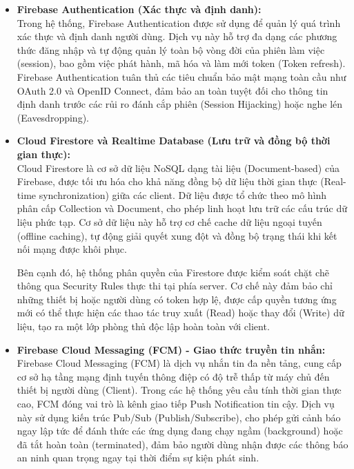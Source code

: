 \begin{itemize}
    \item \textbf{Firebase Authentication (Xác thực và định danh):}\\
    Trong hệ thống, Firebase Authentication được sử dụng để quản lý quá trình xác thực và định danh người dùng. Dịch vụ này hỗ trợ đa dạng các phương thức đăng nhập và tự động quản lý toàn bộ vòng đời của phiên làm việc (session), bao gồm việc phát hành, mã hóa và làm mới token (Token refresh). Firebase Authentication tuân thủ các tiêu chuẩn bảo mật mạng toàn cầu như OAuth 2.0 và OpenID Connect, đảm bảo an toàn tuyệt đối cho thông tin định danh trước các rủi ro đánh cắp phiên (Session Hijacking) hoặc nghe lén (Eavesdropping).

    \item \textbf{Cloud Firestore và Realtime Database (Lưu trữ và đồng bộ thời gian thực):}\\
    Cloud Firestore là cơ sở dữ liệu NoSQL dạng tài liệu (Document-based) của Firebase, được tối ưu hóa cho khả năng đồng bộ dữ liệu thời gian thực (Real-time synchronization) giữa các client. Dữ liệu được tổ chức theo mô hình phân cấp Collection và Document, cho phép linh hoạt lưu trữ các cấu trúc dữ liệu phức tạp. Cơ sở dữ liệu này hỗ trợ cơ chế cache dữ liệu ngoại tuyến (offline caching), tự động giải quyết xung đột và đồng bộ trạng thái khi kết nối mạng được khôi phục. 
    
    Bên cạnh đó, hệ thống phân quyền của Firestore được kiểm soát chặt chẽ thông qua Security Rules thực thi tại phía server. Cơ chế này đảm bảo chỉ những thiết bị hoặc người dùng có token hợp lệ, được cấp quyền tương ứng mới có thể thực hiện các thao tác truy xuất (Read) hoặc thay đổi (Write) dữ liệu, tạo ra một lớp phòng thủ độc lập hoàn toàn với client.

    \item \textbf{Firebase Cloud Messaging (FCM) - Giao thức truyền tin nhắn:}\\
    Firebase Cloud Messaging (FCM) là dịch vụ nhắn tin đa nền tảng, cung cấp cơ sở hạ tầng mạng định tuyến thông điệp có độ trễ thấp từ máy chủ đến thiết bị người dùng (Client). Trong các hệ thống yêu cầu tính thời gian thực cao, FCM đóng vai trò là kênh giao tiếp Push Notification tin cậy. Dịch vụ này sử dụng kiến trúc Pub/Sub (Publish/Subscribe), cho phép gửi cảnh báo ngay lập tức để đánh thức các ứng dụng đang chạy ngầm (background) hoặc đã tắt hoàn toàn (terminated), đảm bảo người dùng nhận được các thông báo an ninh quan trọng ngay tại thời điểm sự kiện phát sinh.


\end{itemize}
